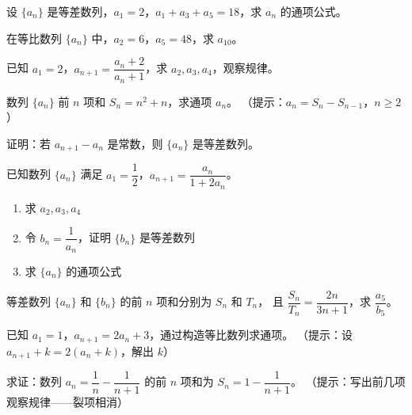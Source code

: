 \begin{exercise}[4]
设 \(\{a_n\}\) 是等差数列，\(a_1 = 2\)，\(a_1 + a_3 + a_5 = 18\)，求 \(a_n\) 的通项公式。
\end{exercise}

\begin{exercise}[4]
在等比数列 \(\{a_n\}\) 中，\(a_2 = 6\)，\(a_5 = 48\)，求 \(a_{10}\)。
\end{exercise}

\begin{exercise}[4]
已知 \(a_1 = 2\)，\(a_{n+1} = \dfrac{a_n + 2}{a_n + 1}\)，求 \(a_2, a_3, a_4\)，观察规律。
\end{exercise}

\begin{exercise}[4]
数列 \(\{a_n\}\) 前 \(n\) 项和 \(S_n = n^2 + n\)，求通项 \(a_n\)。
（提示：\(a_n = S_n - S_{n-1}\)，\(n \ge 2\)）
\end{exercise}

\begin{exercise}[4]
证明：若 \(a_{n+1} - a_n\) 是常数，则 \(\{a_n\}\) 是等差数列。
\end{exercise}


\begin{exercise}[5]
已知数列 \(\{a_n\}\) 满足 \(a_1 = \dfrac{1}{2}\)，\(a_{n+1} = \dfrac{a_n}{1 + 2a_n}\)。
\begin{enumerate}
  \item[(1)] 求 \(a_2, a_3, a_4\)
  \item[(2)] 令 \(b_n = \dfrac{1}{a_n}\)，证明 \(\{b_n\}\) 是等差数列
  \item[(3)] 求 \(\{a_n\}\) 的通项公式
\end{enumerate}
\end{exercise}

\begin{exercise}[5]
等差数列 \(\{a_n\}\) 和 \(\{b_n\}\) 的前 \(n\) 项和分别为 \(S_n\) 和 \(T_n\)，
且 \(\dfrac{S_n}{T_n} = \dfrac{2n}{3n+1}\)，求 \(\dfrac{a_5}{b_5}\)。
\end{exercise}

\begin{exercise}[5]
已知 \(a_1 = 1\)，\(a_{n+1} = 2a_n + 3\)，通过构造等比数列求通项。
（提示：设 \(a_{n+1} + k = 2(a_n + k)\)，解出 \(k\)）
\end{exercise}

\begin{exercise}[5]
求证：数列 \(a_n = \dfrac{1}{n} - \dfrac{1}{n+1}\) 的前 \(n\) 项和为 \(S_n = 1 - \dfrac{1}{n+1}\)。
（提示：写出前几项观察规律——裂项相消）
\end{exercise}

